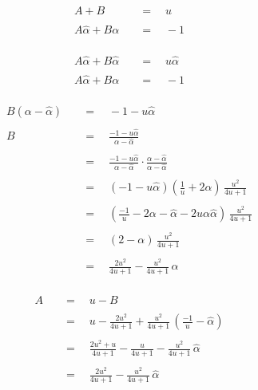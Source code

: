\documentclass[twoside]{article}
\newcommand{\equals}{\ensuremath{\quad =\quad}}
\newcommand{\alphahat}{\ensuremath{\hat{\alpha}}}
\begin{document}
\begin{align*}
A+B			& \equals u		\\
						\\
A\alphahat+B\alpha	& \equals -1		\\
\end{align*}

\begin{align*}
A\alphahat+B\alphahat	& \equals u\alphahat	\\
						\\
A\alphahat+B\alpha	& \equals -1		\\
\end{align*}

\begin{align*}
B(\alpha-\alphahat)	& \equals -1-u\alphahat											\\
																\\
B			& \equals \frac{-1-u\alphahat}{\alpha-\alphahat}							\\
																\\
			& \equals \frac{-1-u\alphahat}{\alpha-\alphahat} \cdot \frac{\alpha-\alphahat}{\alpha-\alphahat}	\\
																\\
			& \equals (-1-u\alphahat)(\frac{1}{u}+2\alpha)\,\frac{u^2}{4u+1}					\\
																\\
			& \equals (\frac{-1}{u}-2\alpha-\alphahat-2u\alpha\alphahat)\,\frac{u^2}{4u+1}				\\
																\\
			& \equals (2-\alpha)\,\frac{u^2}{4u+1}									\\
																\\
			& \equals \frac{2u^2}{4u+1}-\frac{u^2}{4u+1}\,\alpha							\\
\end{align*}

\begin{align*}
A	& \equals u-B												\\
														\\
	& \equals u-\frac{2u^2}{4u+1}+\frac{u^2}{4u+1}\,\left(\frac{-1}{u}-\alphahat\right)			\\
														\\
	& \equals \frac{2u^2+u}{4u+1}-\frac{u}{4u+1}-\frac{u^2}{4u+1}\,\alphahat				\\
														\\
	& \equals \frac{2u^2}{4u+1}-\frac{u^2}{4u+1}\,\alphahat							\\
\end{align*}
\end{document}
